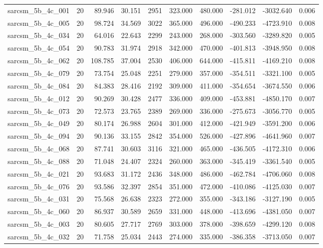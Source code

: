 \begin{tabular}{lrrrrrrrrr}
sarcsm\_5b\_4c\_001 & 20 & 89.946 & 30.151 & 2951 & 323.000 & 480.000 & -281.012 & -3032.640 & 0.006 \\
sarcsm\_5b\_4c\_005 & 20 & 98.724 & 34.569 & 3022 & 365.000 & 496.000 & -490.233 & -4723.910 & 0.008 \\
sarcsm\_5b\_4c\_034 & 20 & 64.016 & 22.643 & 2299 & 243.000 & 268.000 & -303.560 & -3289.820 & 0.005 \\
sarcsm\_5b\_4c\_054 & 20 & 90.783 & 31.974 & 2918 & 342.000 & 470.000 & -401.813 & -3948.950 & 0.008 \\
sarcsm\_5b\_4c\_062 & 20 & 108.785 & 37.004 & 2530 & 406.000 & 644.000 & -415.811 & -4169.210 & 0.008 \\
sarcsm\_5b\_4c\_079 & 20 & 73.754 & 25.048 & 2251 & 279.000 & 357.000 & -354.511 & -3321.100 & 0.005 \\
sarcsm\_5b\_4c\_084 & 20 & 84.383 & 28.416 & 2192 & 309.000 & 411.000 & -354.654 & -3674.550 & 0.006 \\
sarcsm\_5b\_4c\_012 & 20 & 90.269 & 30.428 & 2477 & 336.000 & 409.000 & -453.881 & -4850.170 & 0.007 \\
sarcsm\_5b\_4c\_073 & 20 & 72.573 & 23.765 & 2389 & 269.000 & 336.000 & -275.673 & -3056.770 & 0.005 \\
sarcsm\_5b\_4c\_049 & 20 & 80.174 & 26.988 & 2604 & 301.000 & 412.000 & -421.949 & -3591.200 & 0.006 \\
sarcsm\_5b\_4c\_094 & 20 & 90.136 & 33.155 & 2842 & 354.000 & 526.000 & -427.896 & -4641.960 & 0.007 \\
sarcsm\_5b\_4c\_068 & 20 & 87.741 & 30.603 & 3116 & 321.000 & 465.000 & -436.505 & -4172.310 & 0.006 \\
sarcsm\_5b\_4c\_088 & 20 & 71.048 & 24.407 & 2324 & 260.000 & 363.000 & -345.419 & -3361.540 & 0.005 \\
sarcsm\_5b\_4c\_021 & 20 & 93.683 & 31.172 & 2436 & 348.000 & 486.000 & -462.784 & -4706.060 & 0.008 \\
sarcsm\_5b\_4c\_076 & 20 & 93.586 & 32.397 & 2854 & 351.000 & 472.000 & -410.086 & -4125.030 & 0.007 \\
sarcsm\_5b\_4c\_031 & 20 & 75.568 & 26.638 & 2323 & 272.000 & 355.000 & -343.186 & -3127.190 & 0.005 \\
sarcsm\_5b\_4c\_060 & 20 & 86.937 & 30.589 & 2659 & 331.000 & 448.000 & -413.696 & -4381.050 & 0.007 \\
sarcsm\_5b\_4c\_003 & 20 & 80.605 & 27.717 & 2769 & 303.000 & 378.000 & -398.659 & -4299.120 & 0.008 \\
sarcsm\_5b\_4c\_032 & 20 & 71.758 & 25.034 & 2443 & 274.000 & 335.000 & -386.358 & -3713.050 & 0.007 \\

\end{tabular}
